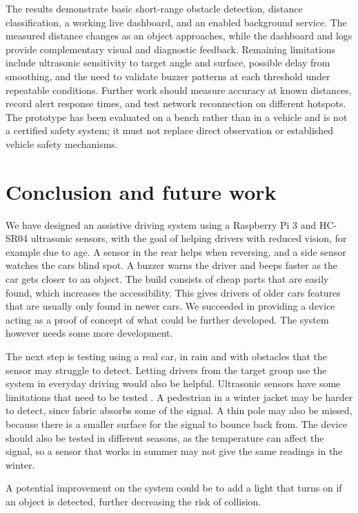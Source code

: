 \documentclass[12pt]{article}
\begin{document}
The results demonstrate basic short-range obstacle detection, distance classification, a working live dashboard, and an enabled background service. The measured distance changes as an object approaches, while the dashboard and logs provide complementary visual and diagnostic feedback. Remaining limitations include ultrasonic sensitivity to target angle and surface, possible delay from smoothing, and the need to validate buzzer patterns at each threshold under repeatable conditions. Further work should measure accuracy at known distances, record alert response times, and test network reconnection on different hotspots. The prototype has been evaluated on a bench rather than in a vehicle and is not a certified safety system; it must not replace direct observation or established vehicle safety mechanisms.

\clearpage
\section{Conclusion and future work}
We have designed an assistive driving system using a Raspberry Pi 3 and HC-SR04 ultrasonic sensors, with the goal of helping drivers with reduced vision, for example due to age. A sensor in the rear helps when reversing, and a side sensor watches the cars blind spot. A buzzer warns the driver and beeps faster as the car gets closer to an object. The build consists of cheap parts that are easily found, which increases the accessibility. This gives drivers of older cars features that are usually only found in newer cars. We succeeded in providing a device acting as a proof of concept of what could be further developed. The system however needs some more development.

\newline
\newline
The next step is testing using a real car, in rain and with obstacles that the sensor may struggle to detect. Letting drivers from the target group use the system in everyday driving would also be helpful. Ultrasonic sensors have some limitations that need to be tested \cite{ept2021limitations}. A pedestrian in a winter jacket may be harder to detect, since fabric absorbs some of the signal. A thin pole may also be missed, because there is a smaller surface for the signal to bounce back from. The device should also be tested in different seasons, as the temperature can affect the signal, so a sensor that works in summer may not give the same readings in the winter. 

A potential improvement on the system could be to add a light that turns on if an object is detected, further decreasing the risk of collision.
\end{document}
